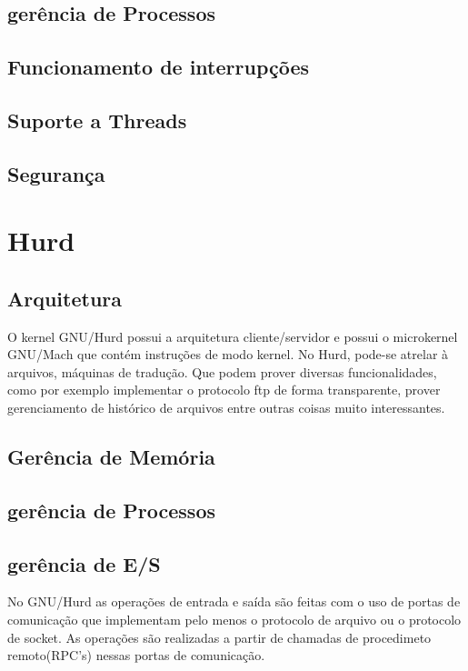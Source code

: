 \documentclass[conference]{IEEEtran}
\begin{document}
\subsection{gerência de Processos}\label{sec:BSDPROC}

\subsection{Funcionamento de interrupções}\label{sec:BSDInt}

\subsection{Suporte a Threads}\label{sec:BSDThreads}

\subsection{Segurança}\label{sec:BSDSec}

\section{Hurd}\label{sec:Hurd}

\subsection{Arquitetura}\label{sec:HurdArq}
O kernel GNU/Hurd possui a arquitetura cliente/servidor e possui o microkernel GNU/Mach que contém instruções de modo kernel. No Hurd, pode-se atrelar à arquivos, máquinas de tradução. Que podem prover diversas funcionalidades, como por exemplo implementar o protocolo ftp de forma transparente, prover gerenciamento de histórico de arquivos entre outras coisas muito interessantes.\cite{HurdPaper}

\subsection{Gerência de Memória}\label{sec:HurdMem}

\subsection{gerência de Processos}\label{sec:HURDPROC}

\subsection{gerência de E/S}\label{sec:HurdES}
No GNU/Hurd as operações de entrada e saída são feitas com o uso de portas de comunicação que implementam pelo menos o protocolo de arquivo ou o protocolo de socket. As operações são realizadas a partir de chamadas de procedimeto remoto(RPC's) nessas portas de comunicação\cite{HurdIO}.
\end{document}
